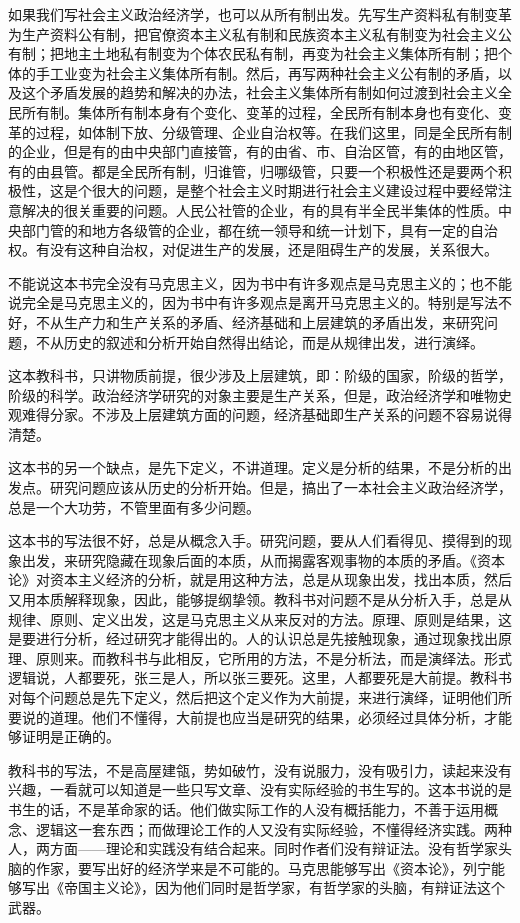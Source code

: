 如果我们写社会主义政治经济学，也可以从所有制出发。先写生产资料私有制变革为生产资料公有制，把官僚资本主义私有制和民族资本主义私有制变为社会主义公有制；把地主土地私有制变为个体农民私有制，再变为社会主义集体所有制；把个体的手工业变为社会主义集体所有制。然后，再写两种社会主义公有制的矛盾，以及这个矛盾发展的趋势和解决的办法，社会主义集体所有制如何过渡到社会主义全民所有制。集体所有制本身有个变化、变革的过程，全民所有制本身也有变化、变革的过程，如体制下放、分级管理、企业自治权等。在我们这里，同是全民所有制的企业，但是有的由中央部门直接管，有的由省、市、自治区管，有的由地区管，有的由县管。都是全民所有制，归谁管，归哪级管，只要一个积极性还是要两个积极性，这是个很大的问题，是整个社会主义时期进行社会主义建设过程中要经常注意解决的很关重要的问题。人民公社管的企业，有的具有半全民半集体的性质。中央部门管的和地方各级管的企业，都在统一领导和统一计划下，具有一定的自治权。有没有这种自治权，对促进生产的发展，还是阻碍生产的发展，关系很大。

不能说这本书完全没有马克思主义，因为书中有许多观点是马克思主义的；也不能说完全是马克思主义的，因为书中有许多观点是离开马克思主义的。特别是写法不好，不从生产力和生产关系的矛盾、经济基础和上层建筑的矛盾出发，来研究问题，不从历史的叙述和分析开始自然得出结论，而是从规律出发，进行演绎。

这本教科书，只讲物质前提，很少涉及上层建筑，即：阶级的国家，阶级的哲学，阶级的科学。政治经济学研究的对象主要是生产关系，但是，政治经济学和唯物史观难得分家。不涉及上层建筑方面的问题，经济基础即生产关系的问题不容易说得清楚。

这本书的另一个缺点，是先下定义，不讲道理。定义是分析的结果，不是分析的出发点。研究问题应该从历史的分析开始。但是，搞出了一本社会主义政治经济学，总是一个大功劳，不管里面有多少问题。

这本书的写法很不好，总是从概念入手。研究问题，要从人们看得见、摸得到的现象出发，来研究隐藏在现象后面的本质，从而揭露客观事物的本质的矛盾。《资本论》对资本主义经济的分析，就是用这种方法，总是从现象出发，找出本质，然后又用本质解释现象，因此，能够提纲挚领。教科书对问题不是从分析入手，总是从规律、原则、定义出发，这是马克思主义从来反对的方法。原理、原则是结果，这是要进行分析，经过研究才能得出的。人的认识总是先接触现象，通过现象找出原理、原则来。而教科书与此相反，它所用的方法，不是分析法，而是演绎法。形式逻辑说，人都要死，张三是人，所以张三要死。这里，人都要死是大前提。教科书对每个问题总是先下定义，然后把这个定义作为大前提，来进行演绎，证明他们所要说的道理。他们不懂得，大前提也应当是研究的结果，必须经过具体分析，才能够证明是正确的。

教科书的写法，不是高屋建瓴，势如破竹，没有说服力，没有吸引力，读起来没有兴趣，一看就可以知道是一些只写文章、没有实际经验的书生写的。这本书说的是书生的话，不是革命家的话。他们做实际工作的人没有概括能力，不善于运用概念、逻辑这一套东西；而做理论工作的人又没有实际经验，不懂得经济实践。两种人，两方面——理论和实践没有结合起来。同时作者们没有辩证法。没有哲学家头脑的作家，要写出好的经济学来是不可能的。马克思能够写出《资本论》，列宁能够写出《帝国主义论》，因为他们同时是哲学家，有哲学家的头脑，有辩证法这个武器。

